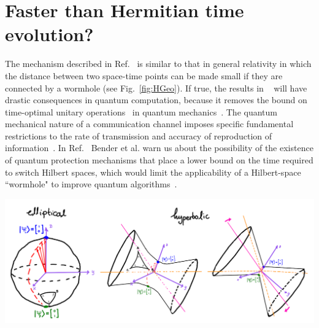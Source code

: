 \documentclass[12pt, a4paper]{report}
\newenvironment{Figure}
    {\par\medskip\noindent\minipage{\linewidth}}
    {\endminipage\par\medskip}
\begin{document}
\section{Faster than Hermitian time evolution?}\label{faster}
The mechanism described in Ref.~\cite{Bender_2007} is similar to that in general relativity in which the distance between two space-time points can be made small if they are connected by a wormhole (see Fig.~\ref{fig:HGeo}). If true, the results in ~\cite{Bender_2007} will have drastic consequences in quantum computation, because it removes the bound on time-optimal unitary operations~\cite{OptimalControl} in quantum mechanics~\cite{Brachistochrone_Mostafazadeh}. The quantum mechanical nature of a communication channel imposes specific fundamental restrictions to the rate of transmission and accuracy of reproduction of information~\cite{StatStructure}. In Ref.~\cite{Bender_2007} Bender et al. warn us about the possibility of the existence of quantum protection mechanisms that place a lower bound on the time required to switch Hilbert spaces, which would limit the applicability of a Hilbert-space ``wormhole" to improve quantum algorithms~\cite{Bender_2007}. 
\begin{Figure}
\centering
\includegraphics[width=\linewidth]{geometriesofH.pdf}
\label{fig:HGeo}
\end{Figure}
\end{document}

